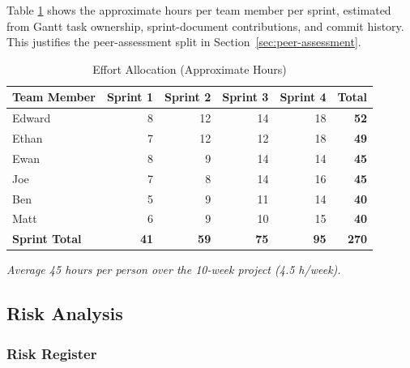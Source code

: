 Table \ref{tab:effort} shows the approximate hours per team member per sprint, estimated from Gantt task ownership, sprint-document contributions, and commit history. This justifies the peer-assessment split in Section~\ref{sec:peer-assessment}.

\begin{table}[H]
\centering
\small
\begin{tabular}{|l|r|r|r|r|r|}
\hline
\textbf{Team Member} & \textbf{Sprint 1} & \textbf{Sprint 2} & \textbf{Sprint 3} & \textbf{Sprint 4} & \textbf{Total} \\ \hline
Edward & 8 & 12 & 14 & 18 & \textbf{52} \\ \hline
Ethan & 7 & 12 & 12 & 18 & \textbf{49} \\ \hline
Ewan & 8 & 9 & 14 & 14 & \textbf{45} \\ \hline
Joe & 7 & 8 & 14 & 16 & \textbf{45} \\ \hline
Ben & 5 & 9 & 11 & 14 & \textbf{40} \\ \hline
Matt & 6 & 9 & 10 & 15 & \textbf{40} \\ \hline
\textbf{Sprint Total} & \textbf{41} & \textbf{59} & \textbf{75} & \textbf{95} & \textbf{270} \\ \hline
\end{tabular}
\caption{Effort Allocation (Approximate Hours)}
\label{tab:effort}
\end{table}

\textit{Average 45 hours per person over the 10-week project (4.5 h/week).}
\subsection{Risk Analysis}

\subsubsection*{Risk Register}

